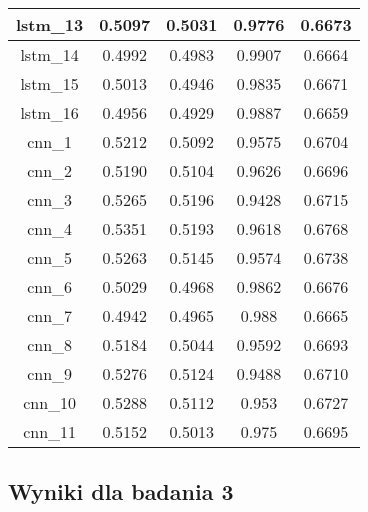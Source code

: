 \begin{table}[]
\begin{tabular}{|c|c|c|c|c|}
        lstm\_13 & 0.5097                       & 0.5031      & 0.9776 & 0.6673 \\ \hline
        lstm\_14 & 0.4992                       & 0.4983      & 0.9907 & 0.6664 \\ \hline
        lstm\_15 & 0.5013                       & 0.4946      & 0.9835 & 0.6671 \\ \hline
        lstm\_16 & 0.4956                       & 0.4929      & 0.9887 & 0.6659 \\ \hline
        cnn\_1   & 0.5212                       & 0.5092      & 0.9575 & 0.6704 \\ \hline
        cnn\_2   & 0.5190                       & 0.5104      & 0.9626 & 0.6696 \\ \hline
        cnn\_3   & 0.5265                       & 0.5196      & 0.9428 & 0.6715 \\ \hline
        cnn\_4   & 0.5351                       & 0.5193      & 0.9618 & 0.6768 \\ \hline
        cnn\_5   & 0.5263                       & 0.5145      & 0.9574 & 0.6738 \\ \hline
        cnn\_6   & 0.5029                       & 0.4968      & 0.9862 & 0.6676 \\ \hline
        cnn\_7   & 0.4942                       & 0.4965      & 0.988  & 0.6665 \\ \hline
        cnn\_8   & 0.5184                       & 0.5044      & 0.9592 & 0.6693 \\ \hline
        cnn\_9   & 0.5276                       & 0.5124      & 0.9488 & 0.6710 \\ \hline
        cnn\_10  & 0.5288                       & 0.5112      & 0.953  & 0.6727 \\ \hline
        cnn\_11  & 0.5152                       & 0.5013      & 0.975  & 0.6695 \\ \hline
    \end{tabular}
\end{table}

\newpage %
\subsection{\label{wyniki_eksperymentow_eks_3}Wyniki dla badania 3}


